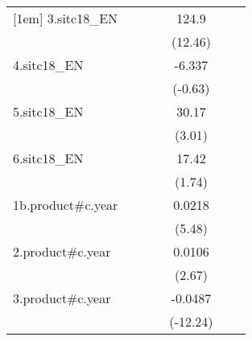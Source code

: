 {\begin{tabular}{l*{6}{c}}
[1em]
3.sitc18\_EN         &                     &                     &                     &       124.9\sym{***}&                     &                     \\
                    &                     &                     &                     &     (12.46)         &                     &                     \\
[1em]
4.sitc18\_EN         &                     &                     &                     &      -6.337         &                     &                     \\
                    &                     &                     &                     &     (-0.63)         &                     &                     \\
[1em]
5.sitc18\_EN         &                     &                     &                     &       30.17\sym{**} &                     &                     \\
                    &                     &                     &                     &      (3.01)         &                     &                     \\
[1em]
6.sitc18\_EN         &                     &                     &                     &       17.42         &                     &                     \\
                    &                     &                     &                     &      (1.74)         &                     &                     \\
[1em]
1b.product#c.year   &                     &                     &                     &      0.0218\sym{***}&                     &                     \\
                    &                     &                     &                     &      (5.48)         &                     &                     \\
[1em]
2.product#c.year    &                     &                     &                     &      0.0106\sym{**} &                     &                     \\
                    &                     &                     &                     &      (2.67)         &                     &                     \\
[1em]
3.product#c.year    &                     &                     &                     &     -0.0487\sym{***}&                     &                     \\
                    &                     &                     &                     &    (-12.24)         &                     &                     \\

\end{tabular}}
